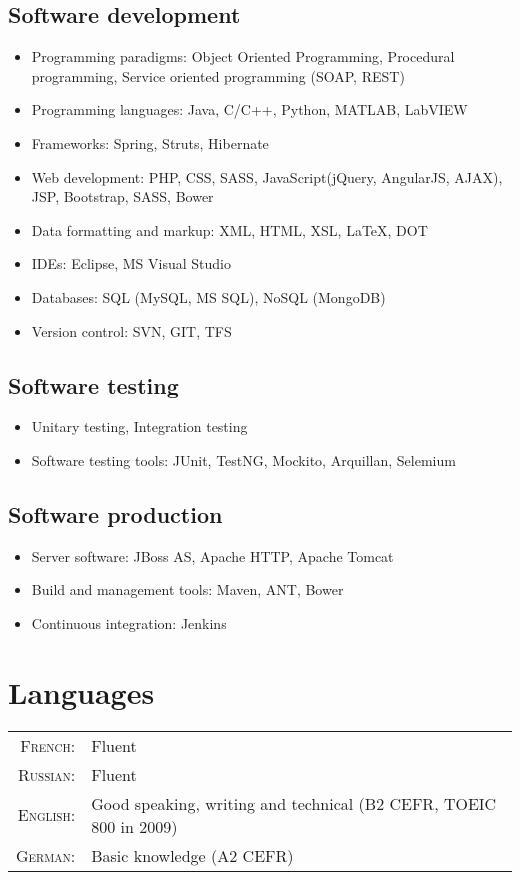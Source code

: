\documentclass[letter,10pt]{article} %
\begin{document}
\subsection*{Software development}
\begin{itemize}
  \item Programming paradigms: Object Oriented Programming,
  Procedural programming, Service oriented
  programming (SOAP, REST)
  \item Programming languages: Java, C/C++, Python,
  MATLAB, LabVIEW
  \item Frameworks: Spring, Struts, Hibernate
  \item Web development: PHP, CSS, SASS, JavaScript(jQuery, AngularJS, AJAX),
  JSP, Bootstrap, SASS, Bower
  \item Data formatting and markup: XML, HTML, XSL, LaTeX, DOT
  \item IDEs: Eclipse, MS Visual Studio
  \item Databases: SQL (MySQL, MS SQL), NoSQL (MongoDB)
  \item Version control: SVN, GIT, TFS
\end{itemize}

\subsection*{Software testing} 
\begin{itemize}
\item Unitary testing, Integration testing
\item Software testing tools: JUnit, TestNG, Mockito, Arquillan, Selemium
\end{itemize}

\subsection*{Software production}
\begin{itemize} 
\item Server software: JBoss AS, Apache HTTP, Apache Tomcat
\item Build and management tools: Maven, ANT, Bower
\item Continuous integration: Jenkins
\end{itemize} 
  

\section{Languages}

\begin{tabular}{rl}
\textsc{French:} & Fluent \\
\textsc{Russian:} & Fluent \\
\textsc{English:} & Good speaking, writing and technical (B2 CEFR, TOEIC 800
in 2009)\\
\textsc{German:} & Basic knowledge (A2 CEFR)\\
\end{tabular}
\end{document}

